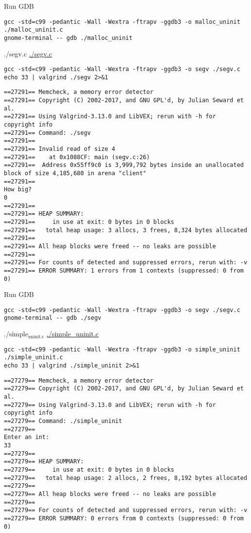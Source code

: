 \documentclass[11pt]{article}
\begin{document}
Run GDB
\begin{verbatim}
gcc -std=c99 -pedantic -Wall -Wextra -ftrapv -ggdb3 -o malloc_uninit ./malloc_uninit.c
gnome-terminal -- gdb ./malloc_uninit
\end{verbatim}

\item ./segv.c
\label{sec:org406f6ca}
\url{./segv.c}

\begin{verbatim}
gcc -std=c99 -pedantic -Wall -Wextra -ftrapv -ggdb3 -o segv ./segv.c
echo 33 | valgrind ./segv 2>&1
\end{verbatim}

\begin{verbatim}
==27291== Memcheck, a memory error detector
==27291== Copyright (C) 2002-2017, and GNU GPL'd, by Julian Seward et al.
==27291== Using Valgrind-3.13.0 and LibVEX; rerun with -h for copyright info
==27291== Command: ./segv
==27291== 
==27291== Invalid read of size 4
==27291==    at 0x1088CF: main (segv.c:26)
==27291==  Address 0x55ff9c0 is 3,999,792 bytes inside an unallocated block of size 4,185,680 in arena "client"
==27291== 
How big?
0
==27291== 
==27291== HEAP SUMMARY:
==27291==     in use at exit: 0 bytes in 0 blocks
==27291==   total heap usage: 3 allocs, 3 frees, 8,324 bytes allocated
==27291== 
==27291== All heap blocks were freed -- no leaks are possible
==27291== 
==27291== For counts of detected and suppressed errors, rerun with: -v
==27291== ERROR SUMMARY: 1 errors from 1 contexts (suppressed: 0 from 0)
\end{verbatim}

Run GDB
\begin{verbatim}
gcc -std=c99 -pedantic -Wall -Wextra -ftrapv -ggdb3 -o segv ./segv.c
gnome-terminal -- gdb ./segv
\end{verbatim}

\item ./simple\(_{\text{uninit.c}}\)
\label{sec:org95daea4}
\url{./simple\_uninit.c}

\begin{verbatim}
gcc -std=c99 -pedantic -Wall -Wextra -ftrapv -ggdb3 -o simple_uninit ./simple_uninit.c
echo 33 | valgrind ./simple_uninit 2>&1
\end{verbatim}

\begin{verbatim}
==27279== Memcheck, a memory error detector
==27279== Copyright (C) 2002-2017, and GNU GPL'd, by Julian Seward et al.
==27279== Using Valgrind-3.13.0 and LibVEX; rerun with -h for copyright info
==27279== Command: ./simple_uninit
==27279== 
Enter an int:
33
==27279== 
==27279== HEAP SUMMARY:
==27279==     in use at exit: 0 bytes in 0 blocks
==27279==   total heap usage: 2 allocs, 2 frees, 8,192 bytes allocated
==27279== 
==27279== All heap blocks were freed -- no leaks are possible
==27279== 
==27279== For counts of detected and suppressed errors, rerun with: -v
==27279== ERROR SUMMARY: 0 errors from 0 contexts (suppressed: 0 from 0)
\end{verbatim}
\end{document}
